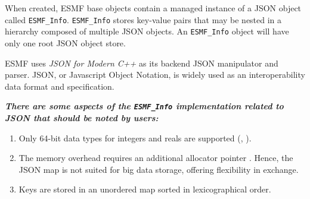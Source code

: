 
When created, ESMF base objects contain a managed instance of a JSON object \cite{json_for_modern_cpp_object} called \texttt{ESMF\_Info}. \texttt{ESMF\_Info} stores key-value pairs that may be nested in a hierarchy composed of multiple JSON objects. An \texttt{ESMF\_Info} object will have only one root JSON object store.

ESMF uses \textit{JSON for Modern C++} \cite{json_for_modern_cpp} as its backend JSON manipulator and parser. JSON, or Javascript Object Notation, is widely used as an interoperability data format and specification.

\textbf{\textit{There are some aspects of the \texttt{ESMF\_Info} implementation related to JSON that should be noted by users:}}
\begin{enumerate}
    \item Only 64-bit data types for integers and reals are supported (\cite{json_for_modern_cpp_64bit_int}, \cite{json_for_modern_cpp_64bit_float}).
    \item The memory overhead requires an additional allocator pointer \cite{json_for_modern_cpp_memory_overhead}. Hence, the JSON map is not suited for big data storage, offering flexibility in exchange.
    \item Keys are stored in an unordered map sorted in lexicographical order.
\end{enumerate}


